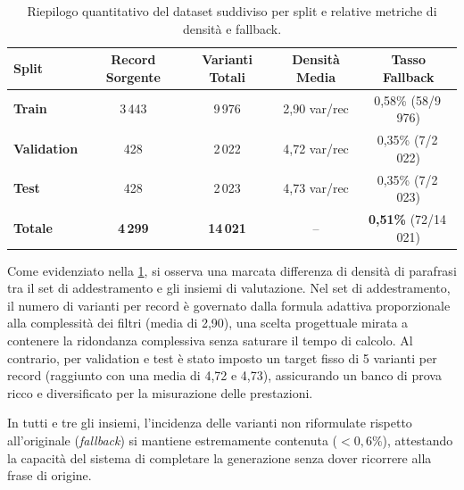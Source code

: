 \documentclass[12pt,a4paper,openright,twoside]{book}
\begin{document}
\begin{table}[H]
    \centering
    \small
    \renewcommand{\arraystretch}{1.2}
    \begin{tabularx}{\textwidth}{X c c c c}
        \toprule
        \textbf{Split}      & \textbf{Record Sorgente}     & \textbf{Varianti
                                                                 Totali} &
        \textbf{Densità
            Media}     &
        \textbf{Tasso
            Fallback}                                                           \\
        \midrule
        \textbf{Train}      & 3\,443                       & 9\,976           &
        2,90 var/rec        & 0,58\% (58/9\,976)
        \\
        \textbf{Validation} & 428                          & 2\,022           &
        4,72 var/rec        & 0,35\% (7/2\,022)
        \\
        \textbf{Test}       & 428                          & 2\,023           &
        4,73 var/rec        & 0,35\% (7/2\,023)
        \\
        \midrule
        \textbf{Totale}     & \textbf{4\,299}              & \textbf{14\,021} &
        --                  & \textbf{0,51\%} (72/14\,021)
        \\
        \bottomrule
    \end{tabularx}
    \caption{Riepilogo quantitativo del dataset suddiviso per split e relative metriche di densità e fallback.}
    \label{tab:dataset-split-summary}
\end{table}

Come evidenziato nella \cref{tab:dataset-split-summary}, si osserva una marcata
differenza di densità di parafrasi tra il set di addestramento e gli insiemi di
valutazione. Nel set di addestramento, il numero di varianti per record è
governato dalla formula adattiva proporzionale alla complessità dei filtri
(media di 2,90), una scelta progettuale mirata a contenere la ridondanza
complessiva senza saturare il tempo di calcolo. Al contrario, per validation e
test è stato imposto un target fisso di 5 varianti per record (raggiunto con una
media di 4,72 e 4,73), assicurando un banco di prova ricco e diversificato per
la misurazione delle prestazioni.

In tutti e tre gli insiemi, l'incidenza delle varianti non riformulate rispetto
all'originale (\textit{fallback}) si mantiene estremamente contenuta
($<0{,}6\%$), attestando la capacità del sistema di completare la generazione
senza dover ricorrere alla frase di origine.
\end{document}
